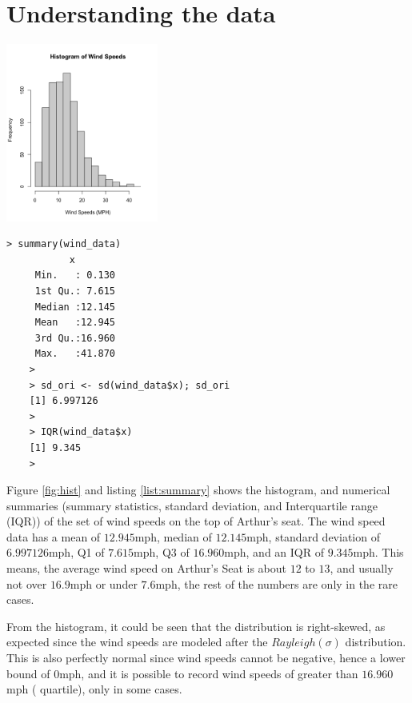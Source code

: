 \documentclass[11pt]{article}
\begin{document}
\section{Understanding the data}
\begin{minipage}{0.5\textwidth}
    \centering
    \includegraphics[width = 5cm]{Histogram.png}
    \label{fig:hist}
\end{minipage}%
\begin{minipage}{0.4\textwidth}
    \centering
    \begin{lstlisting}[caption={Summary Statistics \& S.d of Wind Data},
                        label={list:summary},
                        captionpos=b]
    > summary(wind_data)
           x         
     Min.   : 0.130  
     1st Qu.: 7.615  
     Median :12.145  
     Mean   :12.945  
     3rd Qu.:16.960  
     Max.   :41.870
    > 
    > sd_ori <- sd(wind_data$x); sd_ori
    [1] 6.997126
    >
    > IQR(wind_data$x)
    [1] 9.345
    >
    \end{lstlisting}
\end{minipage}
\par Figure \ref{fig:hist} and listing \ref{list:summary} shows the histogram, and numerical summaries (summary statistics,  standard deviation, and Interquartile range (IQR)) of the set of wind speeds on the top of Arthur's seat. The wind speed data has a mean of $12.945$mph, median of $12.145$mph, standard deviation of $6.997126$mph, Q1 of $7.615$mph, Q3 of $16.960$mph, and an IQR of $9.345$mph. This means, the average wind speed on Arthur's Seat is about $12$ to $13$, and usually not over $16.9$mph or under $7.6$mph, the rest of the numbers are only in the rare cases.\\
\par From the histogram, it could be seen that the distribution is right-skewed, as expected since the wind speeds are modeled after the $Rayleigh(\sigma)$ distribution. This is also perfectly normal since wind speeds cannot be negative, hence a lower bound of $0$mph, and it is possible to record wind speeds of greater than $16.960$mph ( quartile), only in some cases. 
\end{document}
